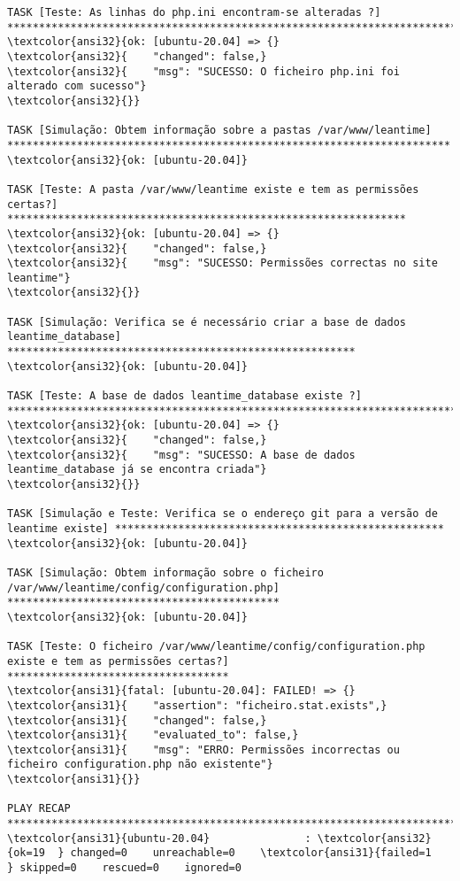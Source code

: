 \documentclass{scrartcl}
\begin{document}
\begin{Verbatim}
TASK [Teste: As linhas do php.ini encontram-se alteradas ?] ******************************************************************************
\textcolor{ansi32}{ok: [ubuntu-20.04] => {}
\textcolor{ansi32}{    "changed": false,}
\textcolor{ansi32}{    "msg": "SUCESSO: O ficheiro php.ini foi alterado com sucesso"}
\textcolor{ansi32}{}}

TASK [Simulação: Obtem informação sobre a pastas /var/www/leantime] **********************************************************************
\textcolor{ansi32}{ok: [ubuntu-20.04]}

TASK [Teste: A pasta /var/www/leantime existe e tem as permissões certas?] ***************************************************************
\textcolor{ansi32}{ok: [ubuntu-20.04] => {}
\textcolor{ansi32}{    "changed": false,}
\textcolor{ansi32}{    "msg": "SUCESSO: Permissões correctas no site leantime"}
\textcolor{ansi32}{}}

TASK [Simulação: Verifica se é necessário criar a base de dados leantime_database] *******************************************************
\textcolor{ansi32}{ok: [ubuntu-20.04]}

TASK [Teste: A base de dados leantime_database existe ?] *********************************************************************************
\textcolor{ansi32}{ok: [ubuntu-20.04] => {}
\textcolor{ansi32}{    "changed": false,}
\textcolor{ansi32}{    "msg": "SUCESSO: A base de dados leantime_database já se encontra criada"}
\textcolor{ansi32}{}}

TASK [Simulação e Teste: Verifica se o endereço git para a versão de leantime existe] ****************************************************
\textcolor{ansi32}{ok: [ubuntu-20.04]}

TASK [Simulação: Obtem informação sobre o ficheiro /var/www/leantime/config/configuration.php] *******************************************
\textcolor{ansi32}{ok: [ubuntu-20.04]}

TASK [Teste: O ficheiro /var/www/leantime/config/configuration.php existe e tem as permissões certas?] ***********************************
\textcolor{ansi31}{fatal: [ubuntu-20.04]: FAILED! => {}
\textcolor{ansi31}{    "assertion": "ficheiro.stat.exists",}
\textcolor{ansi31}{    "changed": false,}
\textcolor{ansi31}{    "evaluated_to": false,}
\textcolor{ansi31}{    "msg": "ERRO: Permissões incorrectas ou ficheiro configuration.php não existente"}
\textcolor{ansi31}{}}

PLAY RECAP *******************************************************************************************************************************
\textcolor{ansi31}{ubuntu-20.04}               : \textcolor{ansi32}{ok=19  } changed=0    unreachable=0    \textcolor{ansi31}{failed=1   } skipped=0    rescued=0    ignored=0



\end{Verbatim}
\end{document}
